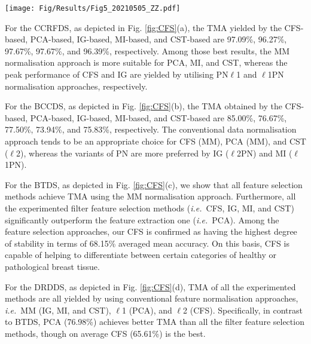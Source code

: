 \documentclass{article}
\newcommand{\zzie}{\emph{i.e.}~}
\newcommand*{\1}{\textcolor{magenta}}
\begin{document}
	\begin{figure*}[!ht]
		\centering
		\texttt{[image: Fig/Results/Fig5\_20210505\_ZZ.pdf]}
		\caption{Detailed classification accuracies of PCA, IG, MI, CST, and CFS feature selection methods on four EHR data sets by varying both feature normalisation methods and classifiers. Best viewed in colour.}
		\label{fig:CFS}
	\end{figure*}
	




	For the CCRFDS, as depicted in Fig. \ref{fig:CFS}(a), the TMA yielded by the CFS-based, PCA-based, IG-based, MI-based, and CST-based are 97.09\%, 96.27\%, 97.67\%, 97.67\%, and 96.39\%, respectively. Among those best results, the MM normalisation approach is more suitable for PCA, MI, and CST, whereas the peak performance of CFS and IG are yielded by utilising PN$\ell$1 and $\ell$1PN normalisation approaches, respectively.
	




	For the BCCDS, as depicted in Fig. \ref{fig:CFS}(b), the TMA obtained by the CFS-based, PCA-based, IG-based, MI-based, and CST-based are 85.00\%, 76.67\%, 77.50\%, 73.94\%, and 75.83\%, respectively. The conventional data normalisation approach tends to be an appropriate choice for CFS (MM), PCA (MM), and CST ($\ell$2), whereas the variants of PN are more preferred by IG ($\ell$2PN) and MI ($\ell$1PN).
	
	




	For the BTDS, as depicted in Fig. \ref{fig:CFS}(c), we show that all feature selection methods achieve TMA using the MM normalisation approach. Furthermore, all the experimented filter feature selection methods (\zzie CFS, IG, MI, and CST) significantly outperform the feature extraction one (\zzie PCA). Among the feature selection approaches, our CFS is confirmed as having the highest degree of stability in terms of 68.15\% averaged mean accuracy. On this basis, CFS is capable of helping to differentiate between certain categories of healthy or pathological breast tissue.
	




	For the DRDDS, as depicted in Fig. \ref{fig:CFS}(d), TMA of all the experimented methods are all yielded by using conventional feature normalisation approaches, \zzie MM (IG, MI, and CST), $\ell$1 (PCA), and $\ell$2 (CFS). Specifically, in contrast to BTDS, PCA (76.98\%) achieves better TMA than all the filter feature selection methods, though on average CFS (65.61\%) is the best.
	
\end{document}
